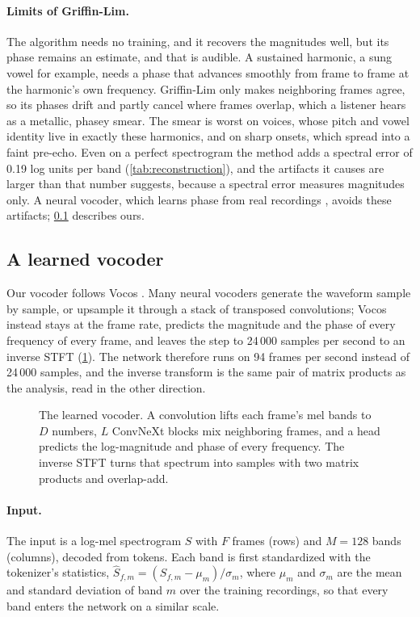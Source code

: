 \paragraph{Limits of Griffin-Lim.} The algorithm needs no training, and it
recovers the magnitudes well, but its phase remains an estimate, and that is
audible. A sustained harmonic, a sung vowel for example, needs a phase that
advances smoothly from frame to frame at the harmonic's own frequency.
Griffin-Lim only makes neighboring frames agree, so its phases drift and
partly cancel where frames overlap, which a listener hears as a metallic,
phasey smear. The smear is worst on voices, whose pitch and vowel identity live
in exactly these harmonics, and on sharp onsets, which spread into a faint
pre-echo. Even on a perfect spectrogram the method adds a spectral error of
0.19 log units per band (\cref{tab:reconstruction}), and the artifacts it
causes are larger than that number suggests, because a spectral error measures
magnitudes only. A neural vocoder, which learns phase from real recordings
\cite{kong2020hifigan,siuzdak2023vocos}, avoids these artifacts;
\cref{sec:vocoder} describes ours.

\subsection{A learned vocoder}
\label{sec:vocoder}

Our vocoder follows Vocos \cite{siuzdak2023vocos}. Many neural vocoders
generate the waveform sample by sample, or upsample it through a stack of
transposed convolutions; Vocos instead stays at the frame rate, predicts the
magnitude and the phase of every frequency of every frame, and leaves the
step to 24\,000 samples per second to an inverse STFT (\cref{fig:vocoder}). The network therefore
runs on 94 frames per second instead of 24\,000 samples, and the inverse
transform is the same pair of matrix products as the analysis, read in the
other direction.

\begin{figure}[htbp]
\centering

\caption{The learned vocoder. A convolution lifts each frame's mel bands to
$D$ numbers, $L$ ConvNeXt blocks mix neighboring frames, and a head predicts
the log-magnitude and phase of every frequency. The inverse STFT turns that
spectrum into samples with two matrix products and overlap-add.}
\label{fig:vocoder}
\end{figure}

\paragraph{Input.} The input is a log-mel spectrogram $S$ with $F$ frames
(rows) and $M = 128$ bands (columns), decoded from tokens. Each band is first
standardized with the tokenizer's statistics, $\hat S_{f,m} = (S_{f,m} -
\mu_m)/\sigma_m$, where $\mu_m$ and $\sigma_m$ are the mean and standard
deviation of band $m$ over the training recordings, so that every band enters
the network on a similar scale.

